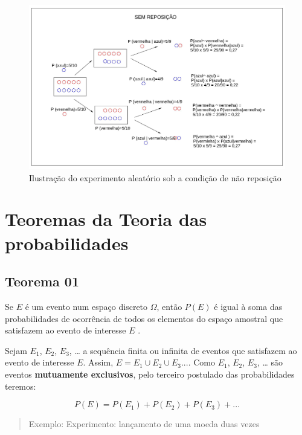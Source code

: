 \documentclass[
]{book}
\begin{document}
\begin{figure}

{\centering \includegraphics[width=0.5\linewidth]{images4/sem_rep} 

}

\caption{Ilustração do experimento aleatório sob a condição de não reposição}\label{fig:unnamed-chunk-73}
\end{figure}

\hypertarget{teoremas-da-teoria-das-probabilidades}{%
\section{Teoremas da Teoria das probabilidades}\label{teoremas-da-teoria-das-probabilidades}}

\hypertarget{teorema-01}{%
\subsection{Teorema 01}\label{teorema-01}}

\hfill\break

Se \(E\) é um evento num espaço discreto \(\Omega\), então \(P(E)\) é igual à soma das probabilidades de ocorrência de todos os elementos do espaço amostral que satisfazem ao evento de interesse \(E\) .

\hfill\break

Sejam \(E_{1}\), \(E_{2}\), \(E_{3}\), \ldots{} a sequência finita ou infinita de eventos que satisfazem ao evento de interesse \(E\). Assim, \(E = E_{1} \cup E_{2} \cup E_{3}...\). Como \(E_{1}\), \(E_{2}\), \(E_{3}\), \ldots{} são eventos \textbf{mutuamente exclusivos}, pelo terceiro postulado das probabilidades teremos:

\hfill\break

\[
P(E) = P(E_{1}) + P(E_{2}) + P(E_{3}) + ...
\]

\hfill\break

\begin{quote}
Exemplo: Experimento: lançamento de uma moeda duas vezes
\end{quote}
\end{document}
